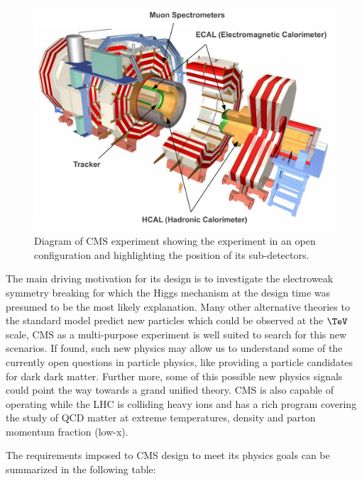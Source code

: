 \begin{figure}[!htb]
  \centering
  \includegraphics[width=1.00\textwidth]{Chapter02/CMS/Images/CMS_Layout_Diagram.pdf}
  \caption{Diagram of \gls{CMS} experiment showing the experiment in an open configuration and highlighting the position of its sub-detectors.}
  \label{FIGURE:ExperimentalApparatus_CMS_Layout_Diagram}
\end{figure}

The main driving motivation for its design is to investigate the electroweak symmetry breaking for which the Higgs mechanism at the design time was presumed to be the most likely explanation. Many other alternative theories to the standard model predict new particles which could be observed at the $\TeV$ scale, \gls{CMS} as a multi-purpose experiment is well suited to search for this new scenarios. If found, such new physics may allow us to understand some of the currently open questions in particle physics, like providing a particle candidates for dark dark matter. Further more, some of this possible new physics signals could point the way towards a grand unified theory. \gls{CMS} is also capable of operating while the \gls{LHC} is colliding heavy ions and has a rich program covering the study of \gls{QCD} matter at extreme temperatures, density and parton momentum fraction (low-x).

The requirements imposed to \gls{CMS} design to meet its physics goals can be summarized in the following table\cite{ARTICLE:TheCMSExperiment}:

